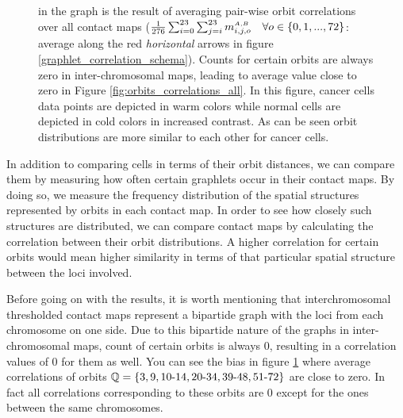 \documentclass[]{article}
\begin{document}
\begin{figure}
{        in the graph is the result of averaging pair-wise
        orbit correlations over all contact maps
        ($\frac{1}{276}\sum_{i=0}^{23}\sum_{j=i}^{23}{
        m^{\scriptscriptstyle \scriptscriptstyle A,B}_{i,j, o}} \quad 
        \forall o \in \{0, 1, ..., 72\}$:
        average along the red \textit{horizontal} arrows in figure 
        \ref{graphlet_correlation_schema}).
        Counts for certain orbits are always zero in inter-chromosomal
        maps, leading to average value close to zero in 
        Figure \ref{fig:orbits_correlations_all}.
        In this figure, cancer cells data points are depicted
        in warm colors while normal cells are depicted in
        cold colors in increased contrast. As can be seen
        orbit distributions are more similar to each other
        for cancer cells.
    }
    \label{fig:orbits_correlations}
\end{figure}

In addition to comparing cells in terms of their
orbit distances, we can compare them by measuring how
often certain graphlets occur in their contact maps. By
doing so, we measure the frequency distribution of the spatial
structures represented by orbits in each contact map. In order
to see how closely such structures are distributed, we can
compare contact maps by calculating the correlation between
their orbit distributions. A higher correlation for certain orbits
would mean higher similarity in terms of that particular spatial
structure between the loci involved.

Before going on with the results,
it is worth mentioning that interchromosomal 
thresholded contact maps 
represent
a bipartide graph with the loci from each chromosome 
on one side. Due to this
bipartide nature of the graphs in inter-chromosomal maps,
count of certain orbits is always 0, resulting in
a correlation values of 0 for them as well.
You can see the bias in 
figure \ref{fig:orbits_correlations} where 
average correlations of orbits
$\mathbb{Q} = \{3, 9, 10{\text -}14, 20{\text -}34, 39{\text -}48, 51{\text -}72\}$ 
are close to zero. In fact all correlations
corresponding to these orbits are 0 except for the ones between 
the same 
chromosomes.
\end{document}
